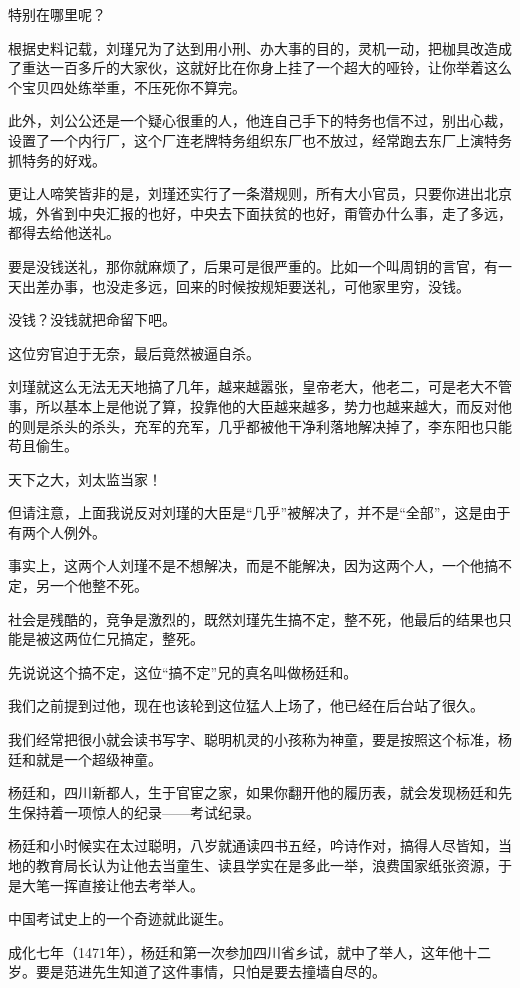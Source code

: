 \begin{multicols}{\theparacolNo}
		特别在哪里呢？

		根据史料记载，刘瑾兄为了达到用小刑、办大事的目的，灵机一动，把枷具改造成了重达一百多斤的大家伙，这就好比在你身上挂了一个超大的哑铃，让你举着这么个宝贝四处练举重，不压死你不算完。

		此外，刘公公还是一个疑心很重的人，他连自己手下的特务也信不过，别出心裁，设置了一个内行厂，这个厂连老牌特务组织东厂也不放过，经常跑去东厂上演特务抓特务的好戏。

		更让人啼笑皆非的是，刘瑾还实行了一条潜规则，所有大小官员，只要你进出北京城，外省到中央汇报的也好，中央去下面扶贫的也好，甭管办什么事，走了多远，都得去给他送礼。

		要是没钱送礼，那你就麻烦了，后果可是很严重的。比如一个叫周钥的言官，有一天出差办事，也没走多远，回来的时候按规矩要送礼，可他家里穷，没钱。

		没钱？没钱就把命留下吧。

		这位穷官迫于无奈，最后竟然被逼自杀。

		刘瑾就这么无法无天地搞了几年，越来越嚣张，皇帝老大，他老二，可是老大不管事，所以基本上是他说了算，投靠他的大臣越来越多，势力也越来越大，而反对他的则是杀头的杀头，充军的充军，几乎都被他干净利落地解决掉了，李东阳也只能苟且偷生。

		天下之大，刘太监当家！

		但请注意，上面我说反对刘瑾的大臣是“几乎”被解决了，并不是“全部”，这是由于有两个人例外。

		事实上，这两个人刘瑾不是不想解决，而是不能解决，因为这两个人，一个他搞不定，另一个他整不死。

		社会是残酷的，竞争是激烈的，既然刘瑾先生搞不定，整不死，他最后的结果也只能是被这两位仁兄搞定，整死。

		先说说这个搞不定，这位“搞不定”兄的真名叫做杨廷和。

		我们之前提到过他，现在也该轮到这位猛人上场了，他已经在后台站了很久。

		我们经常把很小就会读书写字、聪明机灵的小孩称为神童，要是按照这个标准，杨廷和就是一个超级神童。

		杨廷和，四川新都人，生于官宦之家，如果你翻开他的履历表，就会发现杨廷和先生保持着一项惊人的纪录——考试纪录。

		杨廷和小时候实在太过聪明，八岁就通读四书五经，吟诗作对，搞得人尽皆知，当地的教育局长认为让他去当童生、读县学实在是多此一举，浪费国家纸张资源，于是大笔一挥直接让他去考举人。

		中国考试史上的一个奇迹就此诞生。

		成化七年（1471年），杨廷和第一次参加四川省乡试，就中了举人，这年他十二岁。要是范进先生知道了这件事情，只怕是要去撞墙自尽的。


\end{multicols}
